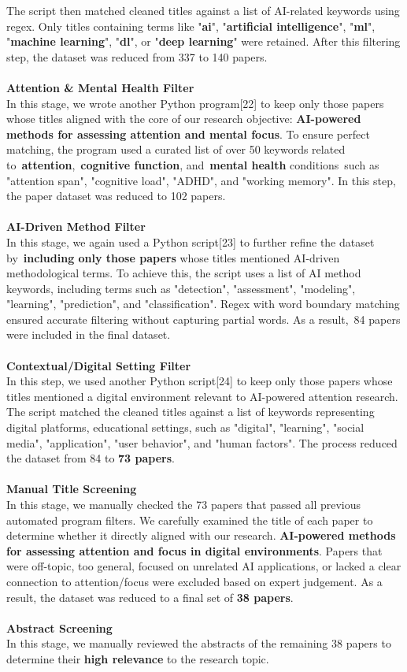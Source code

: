 \documentclass[12pt]{article}
\begin{document}
The script then matched cleaned titles against a list of AI-related keywords using regex. Only titles containing terms like "\textbf{ai}", "\textbf{artificial intelligence}", "\textbf{ml}", "\textbf{machine learning}", "\textbf{dl}", or "\textbf{deep learning}" were retained. After this filtering step, the dataset was reduced from 337 to 140 papers.
 \\ \\
\textbf{Attention \& Mental Health Filter} \\ 
In this stage, we wrote another Python program[22] to keep only those papers whose titles aligned with the core of our research objective: \textbf{AI-powered methods for assessing attention and mental focus}. To ensure perfect matching, the program used a curated list of over 50 keywords related to \textbf{attention}, \textbf{cognitive function}, and \textbf{mental health} conditions such as "attention span", "cognitive load", "ADHD", and "working memory". In this step, the paper dataset was reduced to 102 papers. \\ \\
\textbf{AI-Driven Method Filter} \\ 
In this stage, we again used a Python script[23]  to further refine the dataset by \textbf{including only those papers} whose titles mentioned AI-driven methodological terms. To achieve this, the script uses a list of AI method keywords, including terms such as "detection", "assessment", "modeling", "learning", "prediction", and "classification". Regex with word boundary matching ensured accurate filtering without capturing partial words. As a result, 84 papers were included in the final dataset. \\ \\
\textbf{Contextual/Digital Setting Filter} \\ 
In this step, we used another Python script[24] to keep only those papers whose titles mentioned a digital environment relevant to AI-powered attention research. The script matched the cleaned titles against a list of keywords representing digital platforms, educational settings, such as "digital", "learning", "social media", "application", "user behavior", and "human factors". The process reduced the dataset from 84 to \textbf{73 papers}. \\ \\
\textbf{Manual Title Screening} \\ 
In this stage, we manually checked the 73 papers that passed all previous automated program filters. We carefully examined the title of each paper to determine whether it directly aligned with our research. \textbf{AI-powered methods for assessing attention and focus in digital environments}. Papers that were off-topic, too general, focused on unrelated AI applications, or lacked a clear connection to attention/focus were excluded based on expert judgement. As a result, the dataset was reduced to a final set of \textbf{38 papers}. \\ \\
\textbf{Abstract Screening} \\ 
In this stage, we manually reviewed the abstracts of the remaining 38 papers to determine their \textbf{high relevance} to the research topic. 
\end{document}
